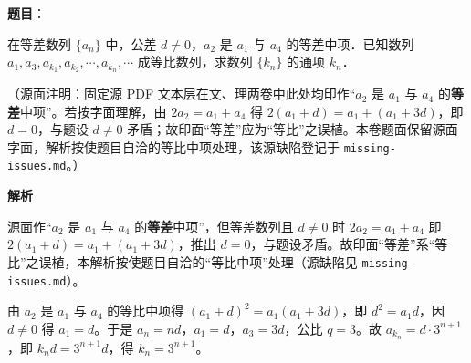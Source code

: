 \begin{answer}

\textbf{题目}：

在等差数列 $\{a_n\}$ 中，公差 $d \neq 0$，$a_2$ 是 $a_1$ 与 $a_4$ 的等差中项．已知数列 $a_1, a_3, a_{k_1}, a_{k_2}, \cdots, a_{k_n}, \cdots$ 成等比数列，求数列 $\{k_n\}$ 的通项 $k_n$．

\begin{gktip}
（源面注明：固定源 PDF 文本层在文、理两卷中此处均印作“$a_2$ 是 $a_1$ 与 $a_4$ 的\textbf{等差}中项”。若按字面理解，由 $2a_2 = a_1 + a_4$ 得 $2(a_1+d) = a_1 + (a_1+3d)$，即 $d = 0$，与题设 $d\neq 0$ 矛盾；故印面“等差”应为“等比”之误植。本卷题面保留源面字面，解析按使题目自洽的等比中项处理，该源缺陷登记于 \texttt{missing-issues.md}。）
\end{gktip}

\textbf{解析}

源面作“$a_2$ 是 $a_1$ 与 $a_4$ 的\textbf{等差}中项”，但等差数列且 $d \neq 0$ 时 $2a_2 = a_1 + a_4$ 即 $2(a_1 + d) = a_1 + (a_1 + 3d)$，推出 $d = 0$，与题设矛盾。故印面“等差”系“等比”之误植，本解析按使题目自洽的“等比中项”处理（源缺陷见 \texttt{missing-issues.md}）。

由 $a_2$ 是 $a_1$ 与 $a_4$ 的等比中项得 $(a_1 + d)^2 = a_1(a_1 + 3d)$，即 $d^2 = a_1 d$，因 $d \neq 0$ 得 $a_1 = d$。于是 $a_n = nd$，$a_1 = d$，$a_3 = 3d$，公比 $q = 3$。故 $a_{k_n} = d \cdot 3^{n+1}$，即 $k_n d = 3^{n+1} d$，得 $k_n = 3^{n+1}$。


\end{answer}
